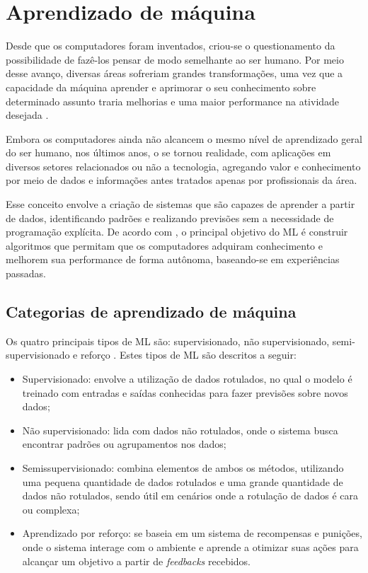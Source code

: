 \section{Aprendizado de máquina}

Desde que os computadores foram inventados, criou-se o questionamento da possibilidade de fazê-los pensar de modo semelhante ao ser humano. Por meio desse avanço, diversas áreas sofreriam grandes transformações, uma vez que a capacidade da máquina aprender e aprimorar o seu conhecimento sobre determinado assunto traria melhorias e uma maior performance na atividade desejada \cite{carbonell1983}.

Embora os computadores ainda não alcancem o mesmo nível de aprendizado geral do ser humano, nos últimos anos, o  se tornou realidade, com aplicações em diversos setores relacionados ou não a tecnologia, agregando valor e conhecimento por meio de dados e informações antes tratados apenas por profissionais da área.

Esse conceito envolve a criação de sistemas que são capazes de aprender a partir de dados, identificando padrões e realizando previsões sem a necessidade de programação explícita. De acordo com \cite{carbonell1983}, o principal objetivo do \gls{ML} é construir algoritmos que permitam que os computadores adquiram conhecimento e melhorem sua performance de forma autônoma, baseando-se em experiências passadas.

\subsection{Categorias de aprendizado de máquina}

Os quatro principais tipos de \gls{ML} são: supervisionado, não supervisionado, semi-supervisionado e reforço \cite{saravanan2018}. Estes tipos de \gls{ML} são descritos a seguir:

\begin{itemize}
    \item Supervisionado: envolve a utilização de dados rotulados, no qual o modelo é treinado com entradas e saídas conhecidas para fazer previsões sobre novos dados;
    \item Não supervisionado: lida com dados não rotulados, onde o sistema busca encontrar padrões ou agrupamentos nos dados;
    \item Semissupervisionado: combina elementos de ambos os métodos, utilizando uma pequena quantidade de dados rotulados e uma grande quantidade de dados não rotulados, sendo útil em cenários onde a rotulação de dados é cara ou complexa;
    \item Aprendizado por reforço: se baseia em um sistema de recompensas e punições, onde o sistema interage com o ambiente e aprende a otimizar suas ações para alcançar um objetivo a partir de \textit{feedbacks} recebidos.
\end{itemize}


